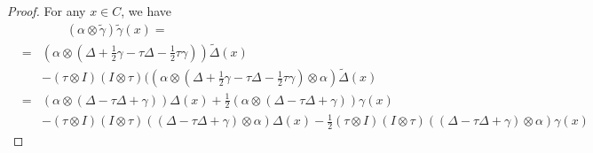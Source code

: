 \documentclass{article}
\theoremstyle{definition}
\theoremstyle{remark}
\numberwithin{equation}{section}
\begin{document}
\begin{proof}
 For any $x\in C$, we have
\begin{eqnarray}
 &&\qquad(\alpha\otimes\tilde\gamma)\tilde\gamma(x)=\nonumber\\
&=&(\alpha\otimes(\Delta+\frac{1}{2}\gamma-\tau\Delta-\frac{1}{2}\tau\gamma))\tilde\Delta(x)\nonumber\\
&&-(\tau\otimes I)(I\otimes\tau)((\alpha\otimes(\Delta+\frac{1}{2}\gamma-\tau\Delta-\frac{1}{2}\tau\gamma)\otimes \alpha)\tilde\Delta(x)\nonumber\\
&=&(\alpha\otimes(\Delta-\tau\Delta+\gamma))\Delta(x)+\frac{1}{2}(\alpha\otimes(\Delta-\tau\Delta+\gamma))\gamma(x)\nonumber\\
&&-(\tau\otimes I)(I\otimes\tau)((\Delta-\tau\Delta+\gamma)\otimes \alpha)\Delta(x)
-\frac{1}{2}(\tau\otimes I)(I\otimes\tau)((\Delta-\tau\Delta+\gamma)\otimes \alpha)\gamma(x)\nonumber
\end{eqnarray}



\end{proof}
\end{document}
